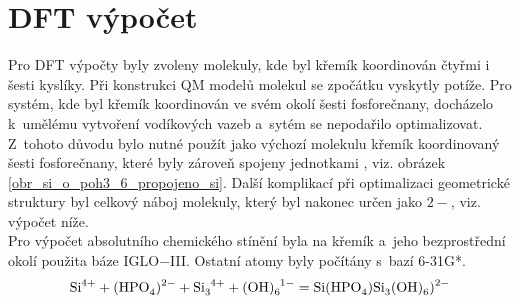 \documentclass[
  printed, %
  table,   %
  lof,     %
  lot,     %
  oneside,
]{fithesis3}
\begin{document}
\begin{figure}
\begin{center}
\label{obr_sio3p_vysledky_I}\end{center}
\end{figure} 
  
\section{DFT výpočet} \label{kapitola_DFT}
Pro DFT výpočty byly zvoleny molekuly, kde byl křemík koordinován čtyřmi i šesti kyslíky. Při konstrukci QM modelů molekul se zpočátku vyskytly potíže. Pro systém, kde byl křemík koordinován ve svém okolí šesti fosforečnany, docházelo k~umělému vytvoření vodíkových vazeb a~sytém se nepodařilo optimalizovat. Z~tohoto důvodu bylo nutné použít jako výchozí molekulu křemík koordinovaný šesti fosforečnany, které byly zároveň spojeny jednotkami , viz. obrázek \ref{obr_si_o_poh3_6_propojeno_si}. Další komplikací při optimalizaci geometrické struktury byl celkový náboj molekuly, který byl nakonec určen jako $2-$, viz. výpočet níže. \\
Pro výpočet absolutního chemického stínění byla na křemík a~jeho bezprostřední okolí použita báze IGLO$-$III. Ostatní atomy byly počítány s~bazí 6-31G*. 
\begin{displaymath}
\ce{Si}^{4+} + \ce{(HPO4)^{2-}} + \ce{Si3^{4+}} + \ce{(OH)6^1-} = \ce{Si(HPO4)Si3(OH)6)^{2-}}
\end{displaymath}
\end{document}

